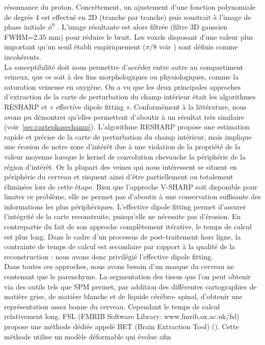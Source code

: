 {résonnance du proton. Concrètement, un ajustement d’une fonction polynomiale de degrés 4 est
effectué en 2D (tranche par tranche) puis soustrait à l’image de phase initiale $\phi^0$ . L’image résultante
est alors filtrée (filtre 3D gaussien FWHM=2.35 mm) pour réduire le bruit. Les voxels disposant d’une
valeur plus important qu’un seuil établi empiriquement ($\pi/8$ voir \cite{Schweser2011}) sont définis comme incohérents.\\
La susceptibilité doit nous permettre d’accéder entre autre au compartiment veineux, que ce
soit à des fins morphologiques ou physiologiques, comme la saturation veineuse en oxygène. On a vu
que les deux principales approches d’extraction de la carte de perturbation du champ intérieur était
les algorithmes RESHARP et « effective dipole fitting ». Conformément à la littérature, nous avons pu
démontrer qu’elles permettent d’aboutir à un résultat très similaire (voir~\ref{sec:cartephasechamp}). L’algorithme RESHARP
propose une estimation rapide et précise de la carte de perturbation du champ intérieur, mais implique
une érosion de notre zone d’intérêt due à une violation de la propriété de la valeur moyenne lorsque le kernel de convolution chevauche la périphérie de la région d’intérêt. Or la plupart des veines qui
nous intéressent se situent en périphérie du cerveau et risquent ainsi d’être partiellement ou
totalement éliminées lors de cette étape. Bien que l’approche V-SHARP soit disponible pour limiter ce
problème, elle ne permet pas d’aboutir à une conservation suffisante des informations les plus
périphériques. L’effective dipole fitting permet d’assurer l’intégrité de la carte reconstruite, puisqu’elle
ne nécessite pas d’érosion. En contrepartie du fait de son approche complètement itérative, le temps
de calcul est plus long. Dans le cadre d’un processus de post-traitement hors ligne, la contrainte de
temps de calcul est secondaire par rapport à la qualité de la reconstruction : nous avons donc privilégié
l’effective dipole fitting.\\
Dans toutes ces approches, nous avons besoin d’un masque du cerveau ne contenant que le
parenchyme. La segmentation des tissus que l’on peut obtenir via des outils tels que SPM permet, par
addition des différentes cartographies de matière grise, de matière blanche et de liquide cérébro-
spinal, d’obtenir une représentation assez bonne du cerveau. Cependant le temps de calcul
relativement long. FSL (FMRIB Software Library: www.fmrib.ox.ac.uk/fsl) propose une méthode dédiée
appelé BET (Brain Extraction Tool) (\cite{Smith2002}). Cette méthode utilise un modèle déformable qui évolue afin
}
